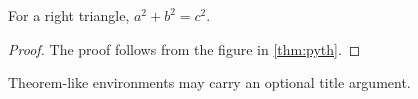 \begin{theorem}[Pythagoras]\label{thm:pyth}
  For a right triangle, $a^2 + b^2 = c^2$.
\end{theorem}

\begin{proof}
  The proof follows from the figure in \autoref{thm:pyth}.
\end{proof}

\begin{remark}
  Theorem-like environments may carry an optional title argument.
\end{remark}
